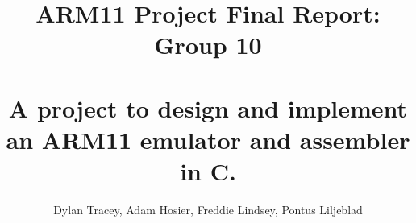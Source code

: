 \title{ARM11 Project Final Report: Group 10 \\ ~\\ A project to design and implement an ARM11 emulator and assembler in C.}
\author{Dylan Tracey, Adam Hosier, Freddie Lindsey, Pontus Liljeblad}